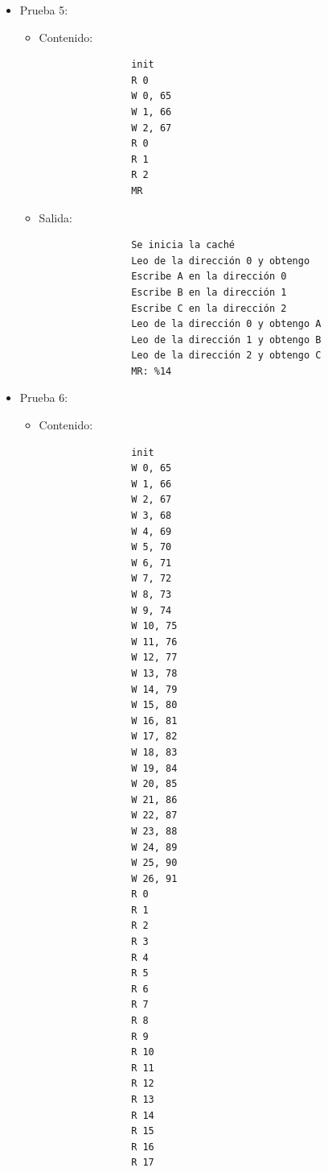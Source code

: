 \documentclass[titlepage,a4paper]{article}
\begin{document}
\begin{itemize}
\begin{itemize}
\begin{verbatim}
                MR: %20
            \end{verbatim}
    \end{itemize}
    \item Prueba 5:
    \begin{itemize}
        \item Contenido:
            \begin{verbatim}
                init
                R 0
                W 0, 65
                W 1, 66
                W 2, 67
                R 0
                R 1
                R 2
                MR
            \end{verbatim}
        \item Salida:
            \begin{verbatim}
                Se inicia la caché
                Leo de la dirección 0 y obtengo 
                Escribe A en la dirección 0
                Escribe B en la dirección 1
                Escribe C en la dirección 2
                Leo de la dirección 0 y obtengo A
                Leo de la dirección 1 y obtengo B
                Leo de la dirección 2 y obtengo C
                MR: %14
            \end{verbatim}
    \end{itemize}
    \item Prueba 6:
    \begin{itemize}
        \item Contenido:
            \begin{verbatim}
                init
                W 0, 65
                W 1, 66
                W 2, 67
                W 3, 68
                W 4, 69
                W 5, 70
                W 6, 71
                W 7, 72
                W 8, 73
                W 9, 74
                W 10, 75
                W 11, 76
                W 12, 77
                W 13, 78
                W 14, 79
                W 15, 80
                W 16, 81
                W 17, 82
                W 18, 83
                W 19, 84
                W 20, 85
                W 21, 86
                W 22, 87
                W 23, 88
                W 24, 89
                W 25, 90
                W 26, 91
                R 0
                R 1
                R 2
                R 3
                R 4
                R 5
                R 6
                R 7
                R 8
                R 9
                R 10
                R 11
                R 12
                R 13
                R 14
                R 15
                R 16
                R 17

\end{verbatim}
\end{itemize}
\end{itemize}
\end{document}
